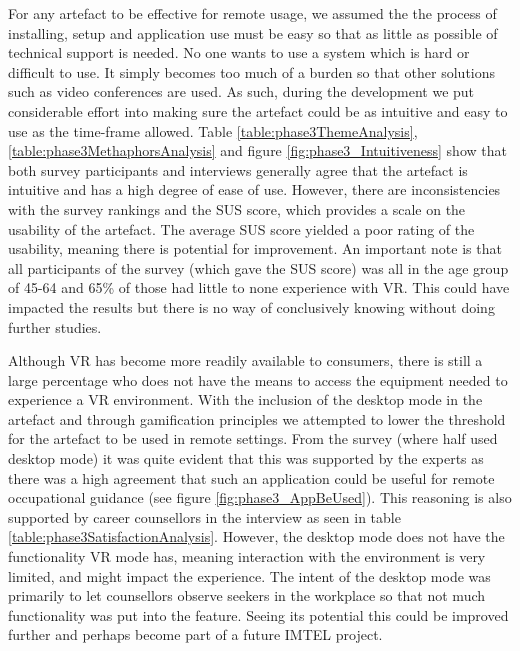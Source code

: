 For any artefact to be effective for remote usage, we assumed the the process of installing, setup and application use must be easy so that as little as possible of technical support is needed. No one wants to use a system which is hard or difficult to use. It simply becomes too much of a burden so that other solutions such as video conferences are used. As such, during the development we put considerable effort into making sure the artefact could be as intuitive and easy to use as the time-frame allowed. Table \ref{table:phase3ThemeAnalysis}, \ref{table:phase3MethaphorsAnalysis} and figure \ref{fig:phase3_Intuitiveness} show that both survey participants and interviews generally agree that the artefact is intuitive and has a high degree of ease of use. However, there are inconsistencies with the survey rankings and the SUS score, which provides a scale on the usability of the artefact. The average  SUS score yielded a poor rating of the usability, meaning there is potential for improvement. An important note is that all participants of the survey (which gave the SUS score) was all in the age group of 45-64 and 65\% of those had little to none experience with VR. This could have impacted the results but there is no way of conclusively knowing without doing further studies.  


Although VR has become more readily available to consumers, there is still a large percentage who does not have the means to access the equipment needed to experience a VR environment. With the inclusion of the desktop mode in the artefact and through gamification principles we attempted to lower the threshold for the artefact to be used in remote settings. From the survey (where half used desktop mode) it was quite evident that this was supported by the experts as there was a high agreement that such an application could be useful for remote occupational guidance (see figure \ref{fig:phase3_AppBeUsed}). This reasoning is also supported by career counsellors in the interview as seen in table \ref{table:phase3SatisfactionAnalysis}. However, the desktop mode does not have the functionality VR mode has, meaning interaction with the environment is very limited, and might impact the experience. The intent of the desktop mode was primarily to let counsellors observe seekers in the workplace so that not much functionality was put into the feature. Seeing its potential this could be improved further and perhaps become part of a future IMTEL project. 



